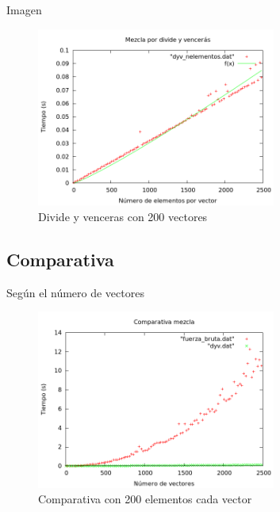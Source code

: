 \begin{frame}{Imagen}
	\begin{block}{ }
	
	\begin{figure}[h] 
	\centering
	\includegraphics[width=0.7\textwidth]{../Obligatorio/Graficas/dyv_nelementos.png}
	\caption{Divide y venceras con 200 vectores} 
	\label{fig:d_nelementos} 
	\end{figure}
	
	\end{block}
\end{frame}


\subsection{Comparativa}
\begin{frame}{Según el número de vectores}
	\begin{block}
	
	\begin{figure}[htb] 
	\centering
	\includegraphics[width=0.7\textwidth]														{../Obligatorio/Graficas/comparativa_kvectores.png}
	\caption{Comparativa con 200 elementos cada vector} 
	\label{fig:comp_kvectores} 
	\end{figure}
	\end{block}
\end{frame}




